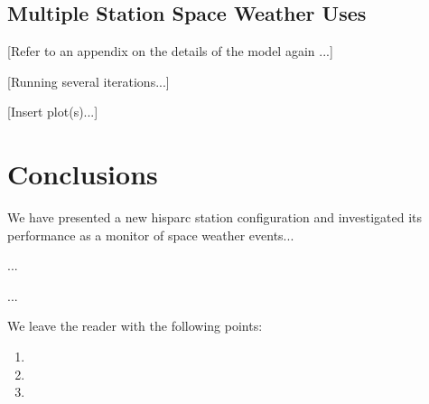 \subsection{Multiple Station Space Weather Uses}\label{sec:HS_14008_multi_sims}



[Refer to an appendix on the details of the model again ...]

[Running several iterations...]

[Insert plot(s)...]


\section{Conclusions}\label{sec:HS_14008_conclusion}

We have presented a new \gls{hisparc} station configuration and investigated its performance as a monitor of space weather events...

...

...


We leave the reader with the following points:

\begin{enumerate}
	\item{}

	\item{}
	
	\item{}
\end{enumerate}